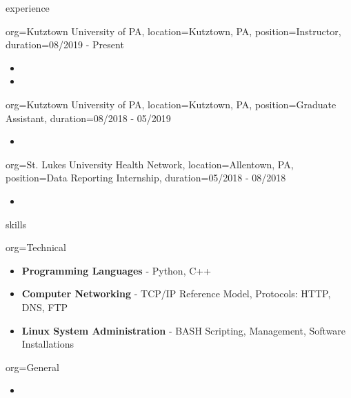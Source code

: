 \documentclass{resume}
\begin{document}
\makeheader

\begin{ResumeSection}{experience}
    \begin{ResumeSubsection}{org={Kutztown University of PA}, location={Kutztown, PA}, position={Instructor}, duration={08/2019 - Present}}
        \begin{itemize}
            \item \lipsum[1][1-3]
            \item \lipsum[2][1-2]
        \end{itemize}
    \end{ResumeSubsection}    
    \begin{ResumeSubsection}{org={Kutztown University of PA}, location={Kutztown, PA}, position={Graduate Assistant}, duration={08/2018 - 05/2019}}
        \begin{itemize}
            \item \lipsum[1][1-3]
        \end{itemize}
    \end{ResumeSubsection}
    \begin{ResumeSubsection}{org={St. Lukes University Health Network}, location={Allentown, PA}, position={Data Reporting Internship}, duration={05/2018 - 08/2018}}
        \begin{itemize}
            \item \lipsum[1][1-2]
        \end{itemize}
    \end{ResumeSubsection}
\end{ResumeSection}

\begin{ResumeSection}{skills}
    \newcommand{\skill}[2]{\textbf{#1} - #2}
    \begin{ResumeSubsection}{org=Technical}
        \begin{itemize}
            \item \skill{Programming Languages}{Python, C++}
            \item \skill{Computer Networking}{TCP/IP Reference Model, Protocols: HTTP, DNS, FTP}
            \item \skill{Linux System Administration}{BASH Scripting, Management, Software Installations}
        \end{itemize}
    \end{ResumeSubsection}
    \begin{ResumeSubsection}{org=General}
        \begin{itemize}
            \item \lipsum[1][1]
        \end{itemize}
    \end{ResumeSubsection}
\end{ResumeSection}
\end{document}

